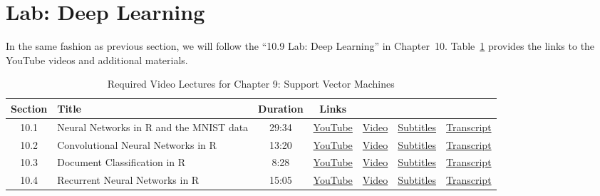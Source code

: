 \documentclass{article}
\begin{document}
\section{Lab: Deep Learning}
\label{sec:lab2}

In the same fashion as previous section, we will follow the ``10.9 Lab: Deep Learning'' in Chapter~10.  Table~\ref{tab:videos} provides the links to the YouTube videos and additional materials.

\begin{table}
  \centering
  \caption{Required Video Lectures for Chapter 9: Support Vector Machines}
  \label{tab:videos}
  \begin{tabular}{c l c c c c c}
    \toprule
      Section & Title & Duration & Links & & & \\
    \midrule
      10.1 & Neural Networks in R and the MNIST data& 29:34 &
      \href{https://youtu.be/Ut647c_aZoc?si=auAF7JIdAZMae3Zd}{YouTube} &
      \href{https://drive.google.com/drive/folders/15vUND0nRTPGUduXl6VK-ioQa1lPOi6G2?usp=sharing}{Video} &
      \href{https://drive.google.com/drive/folders/15vUND0nRTPGUduXl6VK-ioQa1lPOi6G2?usp=sharing}{Subtitles} &
      \href{https://drive.google.com/drive/folders/15vUND0nRTPGUduXl6VK-ioQa1lPOi6G2?usp=sharing}{Transcript} \\
      10.2 & Convolutional Neural Networks in R & 13:20 &
      \href{https://youtu.be/cVtL_ITG8po?si=1WLZ8oY0Z_iZGLhE}{YouTube} &
      \href{https://drive.google.com/drive/folders/15vUND0nRTPGUduXl6VK-ioQa1lPOi6G2?usp=sharing}{Video} &
      \href{https://drive.google.com/drive/folders/15vUND0nRTPGUduXl6VK-ioQa1lPOi6G2?usp=sharing}{Subtitles} &
      \href{https://drive.google.com/drive/folders/15vUND0nRTPGUduXl6VK-ioQa1lPOi6G2?usp=sharing}{Transcript} \\
      10.3 & Document Classification in R & 8:28 &
      \href{https://youtu.be/SFHNg2X9o60?si=oarAOSCj-JyKWgF-}{YouTube} &
      \href{https://drive.google.com/drive/folders/15vUND0nRTPGUduXl6VK-ioQa1lPOi6G2?usp=sharing}{Video} &
      \href{https://drive.google.com/drive/folders/15vUND0nRTPGUduXl6VK-ioQa1lPOi6G2?usp=sharing}{Subtitles} &
      \href{https://drive.google.com/drive/folders/15vUND0nRTPGUduXl6VK-ioQa1lPOi6G2?usp=sharing}{Transcript} \\
      10.4 & Recurrent Neural Networks in R & 15:05 &
      \href{https://youtu.be/bi34fBER1ds?si=lYm_xcfWxtCt6aaa}{YouTube} &
      \href{https://drive.google.com/drive/folders/15vUND0nRTPGUduXl6VK-ioQa1lPOi6G2?usp=sharing}{Video} &
      \href{https://drive.google.com/drive/folders/15vUND0nRTPGUduXl6VK-ioQa1lPOi6G2?usp=sharing}{Subtitles} &
      \href{https://drive.google.com/drive/folders/15vUND0nRTPGUduXl6VK-ioQa1lPOi6G2?usp=sharing}{Transcript} \\
    \bottomrule
  \end{tabular}
\end{table}
\end{document}
